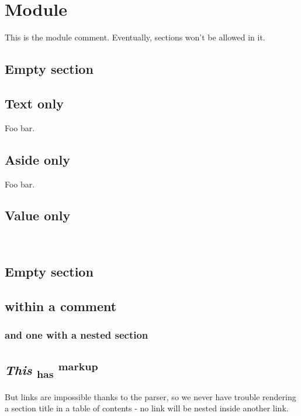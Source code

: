 \section{Module }\label{Section}%
This is the module comment. Eventually, sections won't be allowed in it.

\subsection{Empty section\label{Section--empty-section}}%
\subsection{Text only\label{Section--text-only}}%
Foo bar.

\subsection{Aside only\label{Section--aside-only}}%
Foo bar.

\subsection{Value only\label{Section--value-only}}%
\label{Section--val-foo}\\
\subsection{Empty section\label{Section--empty-section_2}}%
\subsection{within a comment\label{Section--within-a-comment}}%
\subsubsection{and one with a nested section\label{Section--and-one-with-a-nested-section}}%
\subsection{\emph{This}   \textsubscript{has} \textsuperscript{markup}\label{Section--this-section-title-has-markup}}%
But links are impossible thanks to the parser, so we never have trouble rendering a section title in a table of contents - no link will be nested inside another link.



